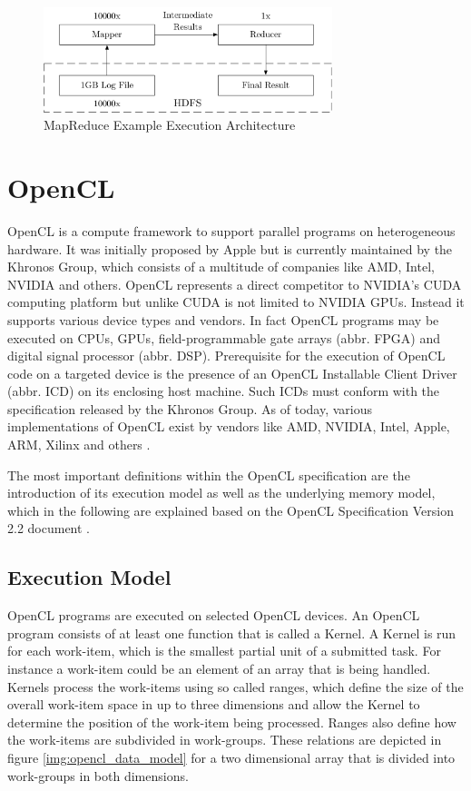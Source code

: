 \begin{figure}[!htb]	
	\includegraphics[width=0.75\textwidth]{drawings/mapreduce_arch.pdf}
	\centering
	\caption{MapReduce Example Execution Architecture}
	\label{img:mapreduce_arch}
\end{figure}

\section{OpenCL}
\label{opencl}
OpenCL is a compute framework to support parallel programs on heterogeneous hardware. It was initially proposed by Apple but is currently maintained by the Khronos Group, which consists of a multitude of companies like AMD, Intel, NVIDIA and others\cite{opencl_directors}. OpenCL represents a direct competitor to NVIDIA's CUDA computing platform but unlike CUDA is not limited to NVIDIA GPUs. Instead it supports various device types and vendors. In fact OpenCL programs may be executed on CPUs, GPUs, field-programmable gate arrays (abbr. FPGA) and digital signal processor (abbr. DSP). Prerequisite for the execution of OpenCL code on a targeted device is the presence of an OpenCL Installable Client Driver (abbr. ICD) on its enclosing host machine. Such ICDs must conform with the specification released by the Khronos Group. As of today, various implementations of OpenCL exist by vendors like AMD, NVIDIA, Intel, Apple, ARM, Xilinx and others \cite{opencl_conform}.

The most important definitions within the OpenCL specification are the introduction of its execution model as well as the underlying memory model, which in the following are explained based on the OpenCL Specification Version 2.2 document \cite{opencl_spec}.

\subsection*{Execution Model}
OpenCL programs are executed on selected OpenCL devices. An OpenCL program consists of at least one function that is called a Kernel. A Kernel is run for each work-item, which is the smallest partial unit of a submitted task. For instance a work-item could be an element of an array that is being handled. Kernels process the work-items using so called ranges, which define the size of the overall work-item space in up to three dimensions and allow the Kernel to determine the position of the work-item being processed. Ranges also define how the work-items are subdivided in work-groups. These relations are depicted in figure \ref{img:opencl_data_model} for a two dimensional array that is divided into work-groups in both dimensions.

